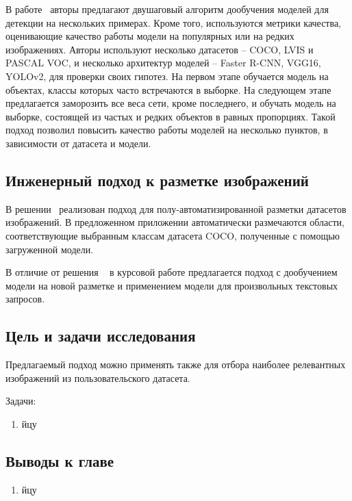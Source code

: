 \documentclass[a4paper,14pt]{article}
\begin{document}
    В работе~\cite{wang2020few} авторы предлагают двушаговый алгоритм дообучения моделей для детекции на нескольких примерах.
    Кроме того, используются метрики качества, оценивающие качество работы модели на популярных или на редких изображениях.
    Авторы используют несколько датасетов -- COCO, LVIS и PASCAL VOC,
    и несколько архитектур моделей -- Faster R-CNN, VGG16, YOLOv2, для проверки своих гипотез.
    На первом этапе обучается модель на объектах, классы которых часто встречаются в выборке.
    На следующем этапе предлагается заморозить все веса сети, кроме последнего, и обучать модель на выборке, состоящей из частых и редких объектов в равных пропорциях.
    Такой подход позволил повысить качество работы моделей на несколько пунктов, в зависимости от датасета и модели.


    \subsection{Инженерный подход к разметке изображений}

    В решении~\cite{AnnoMage} реализован подход для полу-автоматизированной разметки датасетов изображений.
    В предложенном приложении автоматически размечаются области, соответствующие выбранным классам датасета COCO, полученные с помощью загруженной модели.

    В отличие от решения ~\cite{AnnoMage} в курсовой работе предлагается подход с дообучением модели на новой разметке и применением модели для произвольных текстовых запросов.

    \subsection{Цель и задачи исследования}

    Предлагаемый подход можно применять также для отбора наиболее релевантных изображений из пользовательского датасета.

    Задачи:
    \begin{enumerate}
        [1)]
        \itemsep0em
        \item йцу

    \end{enumerate}

    \subsection{Выводы к главе \thesection}
    \begin{enumerate}
        [1)]
        \itemsep0em
        \item йцу
    \end{enumerate}
\end{document}
